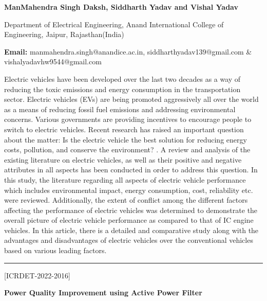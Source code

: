 \documentclass[twoside,11pt]{amsart}
\begin{document}
\centerline{\textbf{ManMahendra Singh Daksh, Siddharth Yadav and Vishal Yadav  }}
\vskip 5mm
\begin{flushleft}
Department of Electrical Engineering, Anand International College of Engineering, Jaipur, Rajasthan(India)
\vskip 5mm
\end{flushleft}
\vskip 2mm
\begin{flushleft}
{\bf Email:} manmahendra.singh@anandice.ac.in, siddharthyadav139@gmail.com \& vishalyadavhw9544@gmail.com
\end{flushleft}
\vskip 5mm
Electric vehicles have been developed over the last two decades as a way of reducing the toxic emissions and energy consumption in the transportation sector. Electric vehicles (EVs) are being promoted aggressively all over the world as a means of reducing fossil fuel emissions and addressing environmental concerns. Various governments are providing incentives to encourage people to switch to electric vehicles. Recent research has raised an important question about the matter: Is the electric vehicle the best solution for reducing energy costs, pollution, and conserve the environment? .
\vskip 2mm
\newpage
\vskip 2mm
A review and analysis of the existing literature on electric vehicles, as well as their positive and negative attributes in all aspects has been conducted in order to address this question. In this study, the literature regarding all aspects of electric vehicle performance which includes environmental impact, energy consumption, cost, reliability etc. were reviewed. Additionally, the extent of conflict among the different factors affecting the performance of electric vehicles was determined to demonstrate the overall picture of electric vehicle performance as compared to that of IC engine vehicles. In this article, there is a detailed and comparative study along with the advantages and disadvantages of electric vehicles over the conventional vehicles based on various leading factors.
\vskip 2mm
\rule{\textwidth}{0.5pt}
\vskip 5mm
\begin{flushleft}
\centerline{[ICRDET-2022-2016]}
\end{flushleft}
\begin{center}\bf\LARGE
Power Quality Improvement using Active Power Filter
\end{center}
\vskip 5mm
\end{document}
